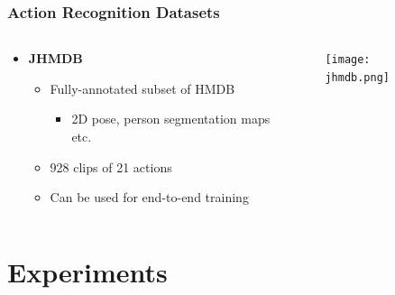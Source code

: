 \documentclass[9pt]{beamer}
\providecommand{\source}{\\ \footnotesize \tugreen{Source:} \footnotemark}
\newenvironment{myframe}[1][]{%
\begin{frame}%
\frametitle{#1}
\setcounter{footnote}{0}


}{%
\end{frame}%
}
\begin{document}
\begin{myframe}[Action Recognition Datasets]
  \begin{columns}[T]
      \begin{column}{.48\textwidth}
          \begin{itemize}
              \item \textbf{JHMDB\footnotemark}
              \begin{itemize}
                  \item Fully-annotated subset of HMDB
                  \begin{itemize}
                      \item 2D pose, person segmentation maps etc.
                  \end{itemize}
                  \item 928 clips of 21 actions
                  \item Can be used for end-to-end training
              \end{itemize}
          \end{itemize}
      \end{column}
      \begin{column}{.48\textwidth}
          \begin{figure}
              \texttt{[image: jhmdb.png]}
              \centering
              \source
          \end{figure}
      \end{column}
  \end{columns}
\end{myframe}

\section{Experiments}

\end{document}
